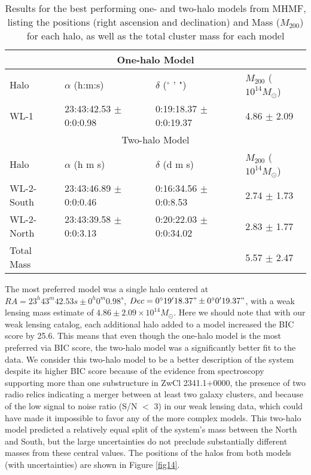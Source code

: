 \documentclass[onecolumn]{aastex}
\begin{document}
\begin{table*}
\centering
\caption{Results for the best performing one- and two-halo models from MHMF, listing the positions (right ascension and declination) and Mass ($M_{200}$) for each halo, as well as the total cluster mass for each model}
\label{tab:MHMFMass}
\begin{tabular}{llll}
\hline
\hline
\multicolumn{4}{c}{One-halo Model}                                          \\ \hline
Halo   & $\alpha$ (h:m:s) & $\delta$ ($^\circ$ ' ") & $M_{200}$ ($10^{14} M_\odot$) \\ \hline
WL-1 & 23:43:42.53 $\pm$ 0:0:0.98 & 0:19:18.37 $\pm$ 0:0:19.37 & 4.86 $\pm$ 2.09 \\ \hline
\hline
\multicolumn{4}{c}{Two-halo Model}                                          \\ \hline
Halo   & $\alpha$ (h m s) & $\delta$ (d m s) & $M_{200}$ ($10^{14} M_\odot$) \\ \hline 
WL-2-South & 23:43:46.89 $\pm$ 0:0:0.46 & 0:16:34.56 $\pm$ 0:0:8.53 & 2.74 $\pm$ 1.73 \\
WL-2-North & 23:43:39.58 $\pm$ 0:0:3.13 & 0:20:22.03 $\pm$ 0:0:34.02 & 2.83 $\pm$ 1.77 \\
Total Mass & & & 5.57 $\pm$ 2.47 \\
\hline
\end{tabular}
\end{table*}

The most preferred model was a single halo centered at $RA = 23^h 43^m 42.53s \pm 0^h 0^m 0.98^s$, $Dec = 0^\circ 19' 18.37" \pm 0^\circ 0' 19.37"$, with a weak lensing mass estimate of $4.86 \pm 2.09 \times 10^{14} M_\odot$.  Here we should note that with our weak lensing catalog, each additional halo added to a model increased the BIC score by 25.6.  This means that even though the one-halo model is the most preferred via BIC score, the two-halo model was a significantly better fit to the data.  We consider this two-halo model to be a better description of the system despite its higher BIC score because of the evidence from spectroscopy supporting more than one substructure in ZwCl 2341.1+0000, the presence of two radio relics indicating a merger between at least two galaxy clusters, and because of the low signal to noise ratio (S/N $<$ 3) in our weak lensing data, which could have made it impossible to favor any of the more complex models.  This two-halo model predicted a relatively equal split of the system's mass between the North and South, but the large uncertainties do not preclude substantially different masses from these central values.  The positions of the halos from both models (with uncertainties) are shown in Figure \ref{fig14}.
\end{document}
